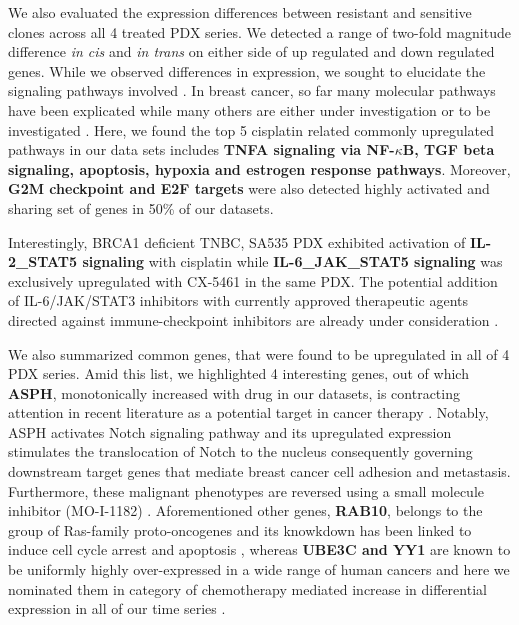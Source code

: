 We also evaluated the expression differences between resistant and sensitive clones across all 4 treated PDX series. We detected a range of two-fold magnitude difference \textit{in cis} and \textit{in trans} on either side of up regulated and down regulated genes. While we observed differences in expression, we sought to elucidate the signaling pathways involved . In breast cancer, so far many molecular pathways have been explicated while many others are either under investigation or to be investigated \cite{hanahan2011hallmarks}. Here, we found the top 5 cisplatin related commonly upregulated pathways in our data sets includes \textbf{TNFA signaling via NF-$\kappa$B, TGF  beta  signaling, apoptosis, hypoxia and estrogen response pathways}. Moreover, \textbf{G2M checkpoint and E2F targets} were also detected highly activated and sharing set of genes in 50\% of our datasets. 

Interestingly, BRCA1 deficient TNBC, SA535 PDX exhibited activation of \textbf{IL-2\_STAT5 signaling} with cisplatin while \textbf{IL-6\_JAK\_STAT5 signaling} was exclusively upregulated with CX-5461 in the same PDX. The potential addition of IL-6/JAK/STAT3 inhibitors with currently approved therapeutic agents directed against immune-checkpoint inhibitors are already under consideration \cite{johnson2018targeting}.

We also summarized common genes, that were found to be upregulated in all of 4 PDX series. Amid this list, we highlighted 4 interesting genes, out of which \textbf{ASPH}, monotonically increased with drug in our datasets, is contracting attention in recent literature as a potential target in cancer therapy \cite{barboro2020aspartate, li2018expression, hou2018recent, kanwal2020aspartate}. Notably, ASPH activates Notch signaling pathway and its upregulated expression stimulates the translocation of Notch to the nucleus consequently governing downstream target genes that mediate breast cancer cell adhesion and metastasis. Furthermore, these malignant phenotypes are reversed using a small molecule inhibitor (MO-I-1182) \cite{lin2019asph}. Aforementioned other genes, \textbf{RAB10}, belongs to the group of Ras-family proto-oncogenes and its knowkdown has been linked to induce cell cycle arrest and apoptosis \cite{zhou2018down}, whereas \textbf{UBE3C and YY1} are known to be uniformly highly over-expressed in a wide range of human cancers and here we nominated them in category of chemotherapy mediated increase in  differential expression in all of our time series \cite{pan2015ubiquitin, zhang2020ube3c, meliala2020biological, wan2012yin}. 

